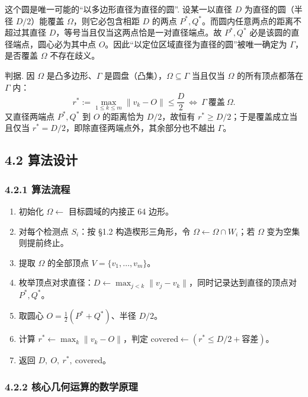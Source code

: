 \documentclass[UTF8, zihao=5,AutoFakeBold=2]{ctexart}
\begin{document}
	这个圆是唯一可能的“以多边形直径为直径的圆”. 设某一以直径 \(D\) 为直径的圆（半径 \(D/2\)）能覆盖 \(\Omega\)，则它必包含相距 \(D\) 的两点 \(P^*,Q^*\)。而圆内任意两点的距离不超过其直径 \(D\)，等号当且仅当这两点恰是一对直径端点。故 \(P^*,Q^*\) 必是该圆的直径端点，圆心必为其中点 \(O\)。因此“以定位区域直径为直径的圆”被唯一确定为 \(\Gamma\)，是否覆盖 \(\Omega\) 不存在歧义。

	判据. 因 \(\Omega\) 是凸多边形、\(\Gamma\) 是圆盘（凸集），\(\Omega\subseteq\Gamma\) 当且仅当 \(\Omega\) 的所有顶点都落在 \(\Gamma\) 内：
	\[
		r^*:=\max_{1\le k\le m}\lVert v_k-O\rVert\le\frac{D}{2}
		\ \Longleftrightarrow\ \Gamma\ \text{覆盖}\ \Omega .
	\]
	又直径两端点 \(P^*,Q^*\) 到 \(O\) 的距离恰为 \(D/2\)，故恒有 \(r^*\ge D/2\)；于是覆盖成立当且仅当 \(r^*=D/2\)，即除直径两端点外，其余部分也不越出 \(\Gamma\)。

	\subsection*{4.2 \quad 算法设计}

	\subsubsection*{4.2.1 \quad 算法流程}

	\begin{enumerate}
		\item 初始化 \(\Omega\leftarrow\) 目标圆域的内接正 64 边形。
		\item 对每个检测点 \(S_i\)：按 \S1.2 构造楔形三角形，令 \(\Omega\leftarrow\Omega\cap W_i\)；若 \(\Omega\) 变为空集则提前终止。
		\item 提取 \(\Omega\) 的全部顶点 \(V=\{v_1,\dots,v_m\}\)。
		\item 枚举顶点对求直径：\(D\leftarrow\max_{j<k}\lVert v_j-v_k\rVert\)，同时记录达到直径的顶点对 \(P^*,Q^*\)。
		\item 取圆心 \(O=\tfrac12(P^*+Q^*)\)、半径 \(D/2\)。
		\item 计算 \(r^*\leftarrow\max_k\lVert v_k-O\rVert\)，判定 \(\mathrm{covered}\leftarrow(r^*\le D/2+\text{容差})\)。
		\item 返回 \(D,\ O,\ r^*,\ \mathrm{covered}\)。
	\end{enumerate}

	\subsubsection*{4.2.2 \quad 核心几何运算的数学原理}
\end{document}
